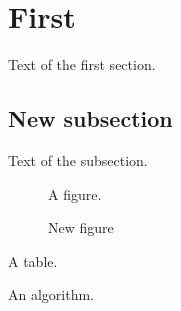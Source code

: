 \documentclass{article}
\begin{document}
\listofalgorithms
\section{First}
\startcontents
{}
Text of the first section.
\subsection{New subsection}
Text of the subsection.
\begin{figure}[h]
\centering A figure.
\caption{New figure}
\end{figure}
\begin{table}[h]
\centering A table.
\caption{New table}
\end{table}
\begin{algorithm}[h]
An algorithm.
\caption{New algorithm}
\end{algorithm}
\end{document}
